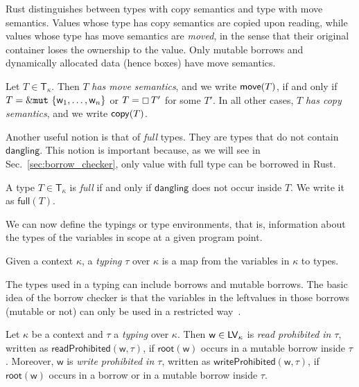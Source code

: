 Rust distinguishes between types with copy semantics
and type with move semantics.
Values whose type has copy semantics
are copied upon reading, while values whose type has
move semantics are \emph{moved}, in the sense that their original container
loses the ownership to the value. Only mutable borrows and dynamically
allocated data (hence boxes) have move semantics.

\begin{definition}\label{def:copy_move}
  Let $T\in\mathsf{T}_\kappa$. Then $T$ \emph{has move semantics}, and we write
  $\mathsf{move}(T)$, if and only if $T=\&\mathtt{mut}\ \{\mathsf{w}_1,\ldots,\mathsf{w}_n\}$ or
  $T=\boxempty\,{T'}$ for some $T'$. In all other cases, $T$ \emph{has copy semantics},
  and we write $\mathsf{copy}(T)$.
\end{definition}

Another useful notion is that of \emph{full} types. They are types that do not contain
$\mathsf{dangling}$. This notion is important because, as we will see
in Sec.~\ref{sec:borrow_checker}, only value with full type can be borrowed in Rust.

\begin{definition}\label{def:full}
  A type $T\in\mathsf{T}_\kappa$ is \emph{full}
  if and only if $\mathsf{dangling}$ does not occur inside $T$.
  We write it as $\mathsf{full}(T)$.
\end{definition}
  
We can now define the typings or type environments, that is,
information about the types of the variables in scope at a given program point.

\begin{definition}[Typing]\label{def:typing}
  Given a context $\kappa$, a \emph{typing} $\tau$ over $\kappa$ is
  a map from the variables in $\kappa$ to types.
\end{definition}

The types used in a typing can include borrows and mutable borrows.
The basic idea of the borrow checker is that the variables in
the leftvalues in those borrows (mutable or not) can only be used
in a restricted way~\cite{Pearce21}.

\begin{definition}\label{def:prohibited}
  Let $\kappa$ be a context and $\tau$ a \emph{typing} over $\kappa$.
  Then $\mathsf{w}\in\mathsf{LV}_\kappa$ is
  \emph{read prohibited in $\tau$},
  written as $\mathsf{readProhibited}(\mathsf{w},\tau)$,
  if $\mathsf{root}(\mathsf{w})$ occurs in a mutable borrow inside $\tau$.
  Moreover, $\mathsf{w}$ is \emph{write prohibited in $\tau$}, written
  as $\mathsf{writeProhibited}(\mathsf{w},\tau)$,
  if $\mathsf{root}(\mathsf{w})$ occurs in a borrow or in a
  mutable borrow inside $\tau$.
\end{definition}

